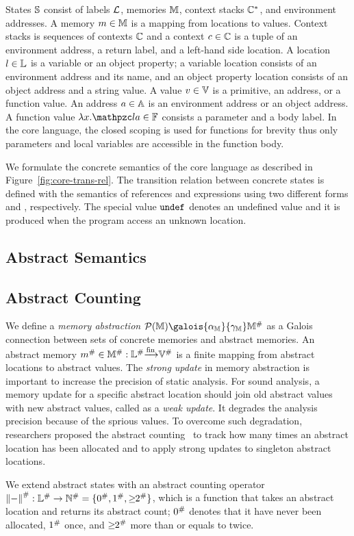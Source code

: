 States $\mathbb{S}$ consist of labels $\mathcal{L}$, memories $\mathbb{M}$, context stacks
$\mathbb{C}^*$, and environment addresses.  A memory $m \in \mathbb{M}$ is a
mapping from locations to values.  Context stacks is sequences of contexts
$\mathbb{C}$ and a context $c \in \mathbb{C}$ is a tuple of an environment
address, a return label, and a left-hand side location.  A location $l \in
\mathbb{L}$ is a variable or an object property; a variable location consists of an
environment address and its name, and an object property location consists of an
object address and a string value.  A value $v \in \mathbb{V}$ is a primitive,
an address, or a function value.  An address $a \in \mathbb{A}$ is an
environment address or an object address.  A function value
$\fval{x}{\lab}{\addr} \in \fvalset$ consists a parameter and a body label.  In
the core language, the closed scoping is used for functions for brevity thus
only parameters and local variables are accessible in the function body.

We formulate the concrete semantics of the core language as described in
Figure~\ref{fig:core-trans-rel}.  The transition relation between concrete
states is defined with the semantics of references and expressions using two
different forms  and
\fbox{$\exprrule{\st}{\expr}{\val}$}, respectively.  The special value
$\texttt{undef}$ denotes an undefined value and it is produced when the program access
an unknown location.


\subsection{Abstract Semantics}

\todo


\subsection{Abstract Counting}

We define a \textit{memory abstraction} $\powerset{\memset}
\galois{\alpha_\memset}{\gamma_\memset} \absmemset$ as a Galois connection
between sets of concrete memories and abstract memories.  An abstract memory
${m}^{\#} \in {\mathbb{M}}^{\#}: {\mathbb{L}}^{\#} {\xrightarrow[]{\text{fin}}} {\mathbb{V}}^{\#}$ is a finite mapping from
abstract locations to abstract values.  The \textit{strong update} in memory
abstraction is important to increase the precision of static analysis.  For
sound analysis, a memory update for a specific abstract location should join old
abstract values with new abstract values, called as a \textit{weak update}.
It degrades the analysis precision because of the sprious values.  To overcome
such degradation, researchers proposed the abstract
counting~\cite{abstract-gc-counting, revisit-recency} to track how many times an
abstract location has been allocated and to apply strong updates to singleton
abstract locations.

We extend abstract states with an abstract counting operator ${\lVert-\rVert}^{\#}:
{\mathbb{L}}^{\#} \rightarrow {\mathbb{N}}^{\#} = \{ {0}^{\#}, {1}^{\#}, {\geq\!\!2}^{\#} \}$, which
is a function that takes an abstract location and returns its abstract count;
${0}^{\#}$ denotes that it have never been allocated, ${1}^{\#}$ once, and
${\geq\!\!2}^{\#}$ more than or equals to twice.
